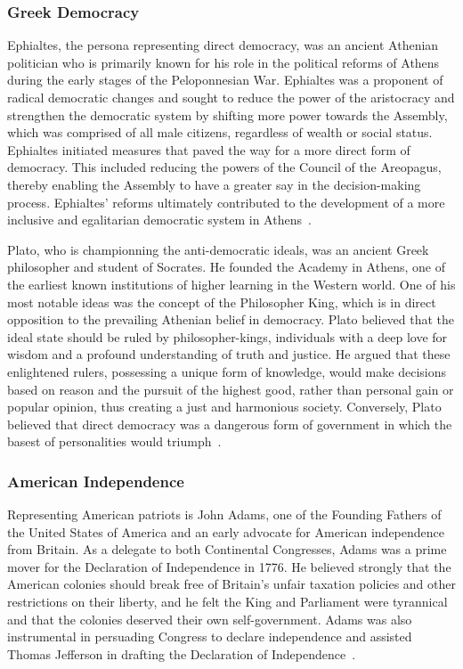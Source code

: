 \documentclass[jair,twoside,11pt,theapa]{article}
\begin{document}
\subsubsection{Greek Democracy}
Ephialtes, the persona representing direct democracy, was an ancient Athenian politician who is primarily known for his role in the political reforms of Athens during the early stages of the Peloponnesian War.  Ephialtes was a proponent of radical democratic changes and sought to reduce the power of the aristocracy and strengthen the democratic system by shifting more power towards the Assembly, which was comprised of all male citizens, regardless of wealth or social status. Ephialtes initiated measures that paved the way for a more direct form of democracy. This included reducing the powers of the Council of the Areopagus, thereby enabling the Assembly to have a greater say in the decision-making process. Ephialtes' reforms ultimately contributed to the development of a more inclusive and egalitarian democratic system in Athens~.

Plato, who is championning the anti-democratic ideals, was an ancient Greek philosopher and student of Socrates. He founded the Academy in Athens, one of the earliest known institutions of higher learning in the Western world. One of his most notable ideas was the concept of the Philosopher King, which is in direct opposition to the prevailing Athenian belief in democracy.  Plato believed that the ideal state should be ruled by philosopher-kings, individuals with a deep love for wisdom and a profound understanding of truth and justice. He argued that these enlightened rulers, possessing a unique form of knowledge, would make decisions based on reason and the pursuit of the highest good, rather than personal gain or popular opinion, thus creating a just and harmonious society.  Conversely, Plato believed that direct democracy was a dangerous form of government in which the basest of personalities would triumph~.

\subsubsection{American Independence}
Representing American patriots is John Adams, one of the Founding Fathers of the United States of America and an early advocate for American independence from Britain.  As a delegate to both Continental Congresses, Adams was a prime mover for the Declaration of Independence in 1776. He believed strongly that the American colonies should break free of Britain's unfair taxation policies and other restrictions on their liberty, and he felt the King and Parliament were tyrannical and that the colonies deserved their own self-government.  Adams was also instrumental in persuading Congress to declare independence and assisted Thomas Jefferson in drafting the Declaration of Independence~.
\end{document}
